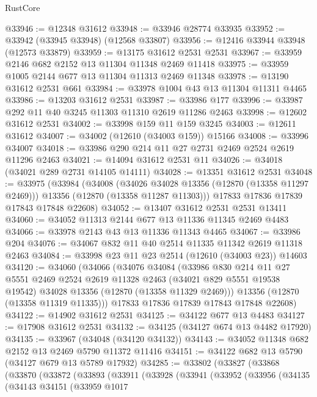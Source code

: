 \begin{lexlean}{RustCore}
\begin{coremodule}
@33946 := @12348 @31612
@33948 := @33946 @28774 @33935
@33952 := @33942 (@33945 @33948) (@12568 @33807)
@33956 := @12416 @33944 @33948 (@12573 @33879)
@33959 := @13175 @31612 @2531 @2531
@33967 := @33959 @2146 @682 @2152 @13 @11304 @11348 @2469 @11418
@33975 := @33959 @1005 @2144 @677 @13 @11304 @11313 @2469 @11348
@33978 := @13190 @31612 @2531 @661
@33984 := @33978 @1004 @43 @13 @11304 @11311 @4465
@33986 := @13203 @31612 @2531
@33987 := @33986 @177
@33996 := @33987 @292 @11 @40 @3245 @11303 @11310 @2619 @11286 @2463
@33998 := @12602 @31612 @2531
@34002 := @33998 @159 @11 @159 @3245
@34003 := @12611 @31612
@34007 := @34002 (@12610 (@34003 @159)) @15166
@34008 := @33996 @34007
@34018 := @33986 @290 @214 @11 @27 @2731 @2469 @2524 @2619 @11296 @2463
@34021 := @14094 @31612 @2531 @11
@34026 := @34018 (@34021 @289 @2731 @14105 @14111)
@34028 := @13351 @31612 @2531
@34048 := @33975
    (@33984
      (@34008
        (@34026 @34028 @13356 (@12870 (@13358 @11297 @2469)))
        @13356
        (@12870 (@13358 @11287 @11303)))
      @17833
      @17836
      @17839
      @17843
      @17848
      @22608)
@34052 := @13407 @31612 @2531 @2531 @13411
@34060 := @34052 @11313 @2144 @677 @13 @11336 @11345 @2469 @4483
@34066 := @33978 @2143 @43 @13 @11336 @11343 @4465
@34067 := @33986 @204
@34076 := @34067 @832 @11 @40 @2514 @11335 @11342 @2619 @11318 @2463
@34084 := @33998 @23 @11 @23 @2514 (@12610 (@34003 @23)) @14603
@34120 := @34060
    (@34066
      (@34076
        @34084
        (@33986
          @830
          @214
          @11
          @27
          @5551
          @2469
          @2524
          @2619
          @11328
          @2463
          (@34021 @829 @5551 @19538 @19542)
          @34028
          @13356
          (@12870 (@13358 @11329 @2469)))
        @13356
        (@12870 (@13358 @11319 @11335)))
      @17833
      @17836
      @17839
      @17843
      @17848
      @22608)
@34122 := @14902 @31612 @2531
@34125 := @34122 @677 @13 @4483
@34127 := @17908 @31612 @2531
@34132 := @34125 (@34127 @674 @13 @4482 @17920)
@34135 := @33967 (@34048 (@34120 @34132))
@34143 := @34052 @11348 @682 @2152 @13 @2469 @5790 @11372 @11416
@34151 := @34122 @682 @13 @5790 (@34127 @679 @13 @5789 @17932)
@34285 := @33802
    (@33827
      (@33868
        (@33870
          (@33872
            (@33893
              (@33911
                (@33928
                  (@33941
                    (@33952
                      (@33956
                        (@34135
                          (@34143
                            @34151
                            (@33959
                              @1017

\end{coremodule}
\end{lexlean}
